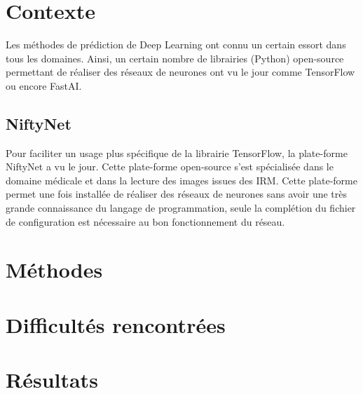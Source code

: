 \documentclass{book}
\newcommand{\p}{\vspace{0.2cm}}
\begin{document}
	\chapter{Contexte}

		Les méthodes de prédiction de Deep Learning ont connu un certain essort dans tous les domaines. Ainsi, un certain nombre de librairies (Python) open-source permettant de réaliser des réseaux de neurones ont vu le jour comme TensorFlow ou encore FastAI.\p

		\section{NiftyNet}

		Pour faciliter un usage plus spécifique de la librairie TensorFlow, la plate-forme NiftyNet a vu le jour. Cette plate-forme open-source s'est spécialisée dans le domaine médicale et dans la lecture des images issues des IRM. Cette plate-forme permet une fois installée de réaliser des réseaux de neurones sans avoir une très grande connaissance du langage de programmation, seule la complétion du fichier de configuration est nécessaire au bon fonctionnement du réseau.\p

	\chapter{Méthodes}

	\chapter{Difficultés rencontrées}

	\chapter{Résultats}

	\backmatter


	\clearpage
	\printindex


	\nocite{*}
	
	
\end{document}
